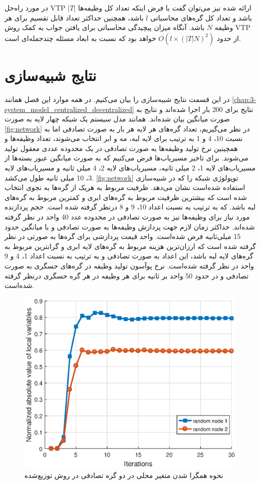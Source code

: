 	در مورد راه‌حل VTP ارائه شده نیز می‌توان گفت با فرض اینکه تعداد کل وظیفه‌ها $|T|$ باشد و تعداد کل گره‌های محاسباتی $l$ باشد، همچنین حداکثر تعداد قابل تقسیم برای هر وظیفه $N$ باشد. آنگاه میزان پیچیدگی محاسباتی برای یافتن جواب به کمک روش VTP از حدود $O(l\times(|T|N)^2)$ خواهد بود که نسبت به ابعاد مسئله چندجمله‌ای است. 
	
\section{نتایج شبیه‌سازی}
	در این قسمت نتایج شبیه‌سازی را بیان می‌کنیم. در همه موارد این فصل همانند \cref{chap:3-system_model_centralized_decentralized} نتایج برای 200 بار اجرا شده‌اند و نتایج به صورت میانگین بیان شده‌اند. همانند مدل سیستم یک شبکه چهار لایه به صورت \cref{fig:network} در نظر می‌گیریم، تعداد گره‌های هر لایه هر بار به صورت تصادفی اما به نسبت 10، 4 و 1 به ترتیب برای لایه لبه، مه و ابر انتخاب می‌شوند، تعداد وظیفه‌ها و همچینین نرخ تولید وظیفه‌ها به صورت تصادفی در یک محدوده عددی معقول تولید می‌شوند. 
	برای تاخیر مسیریاب‌ها فرض می‌کنیم که به صورت میانگین عبور بسته‌ها از مسیریاب‌های لایه 1، 2 میلی ثانیه، مسیریاب‌های لایه 2، 4 میلی ثانیه و مسیریاب‌های لایه 3، 10 میلی ثانیه طول می‌کشد.
\cref{fig:network} توپولوژی شبکه را که در شبیه‌سازی استفاده شده‌است نشان می‌دهد.
	ظرفیت مربوط به هریک از گره‌ها به نجوی انتخاب شده است که بیشترین ظرفیت مربوط به گره‌های ابری و کمترین مربوط به گره‌های لبه باشد. که به ترتیب به نسبت اعداد 10، 9 و 8 درنظر گرفته شده است. حجم پردازنده مورد نیاز برای وظیفه‌ها نیز به صورت تصادفی در محدوده عدد 40 واحد در نظر گرفته شده‌اند. حداکثر زمان لازم جهت پردازش وظیفه‌ها به صورت تصادفی و با میانگین حدود 15 میلی‌ثانیه فرض شده‌است. واحد قیمت پردازشی برای گره‌ها به صورتی در نظر گرفته شده است که ارزان‌ترین هزینه مربوط به گره‌های لایه ابری و گرانترین مربوط به گره‌‌های لایه لبه باشد، این اعداد به صورت تصادفی و به ترتیب به نسبت اعداد 1، 4 و 9 واحد در نظر گرفته شده‌است. نرخ پوآسون تولید وظیفه در گره‌های حسگری به صورت تصادفی و در حدود 50 واحد بر ثانیه برای هر وظیفه در هر گره حسگری درنظر گرفته شده‌است. 


\begin{figure}[h!]
	\centerline{\includegraphics[width=12cm]{graphics/4-heuristic-dist/distributed_local_vars_convergence}}
	\caption{نحوه‌ همگرا شدن متغیر محلی در دو گره تصادفی در روش توزیع‌شده}
	\label{fig:distributed_local_vars_convergence}
\end{figure}

